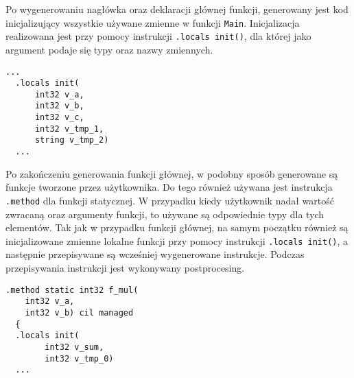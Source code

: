 \par Po wygenerowaniu nagłówka oraz deklaracji głównej funkcji, generowany jest kod inicjalizujący wszystkie używane zmienne w funkcji \texttt{Main}. Inicjalizacja realizowana jest przy pomocy instrukcji \texttt{.locals init()}, dla której jako argument podaje się typy oraz nazwy zmiennych.

\begin{lstlisting}[language=IL, caption={Kod deklaracji zmiennych lokalnych funkcji głównej}, label=alg:asm]
  ...
  .locals init(
      int32 v_a,
      int32 v_b,
      int32 v_c,
      int32 v_tmp_1,
      string v_tmp_2)
  ...
\end{lstlisting}

\par Po zakończeniu generowania funkcji głównej, w podobny sposób generowane są funkcje tworzone przez użytkownika. Do tego również używana jest instrukcja \texttt{.method} dla funkcji statycznej. W przypadku kiedy użytkownik nadał wartość zwracaną oraz argumenty funkcji, to używane są odpowiednie typy dla tych elementów. Tak jak w przypadku funkcji głównej, na samym początku również są inicjalizowane zmienne lokalne funkcji przy pomocy instrukcji \texttt{.locals init()}, a następnie przepisywane są wcześniej wygenerowane instrukcje. Podczas przepisywania instrukcji jest wykonywany postprocesing.

\begin{lstlisting}[language=IL, caption={Kod deklaracji przykładowej funkcji}, label=alg:asm]
  .method static int32 f_mul(
    int32 v_a, 
    int32 v_b) cil managed
  {
  .locals init(
        int32 v_sum,
        int32 v_tmp_0)
  ...
\end{lstlisting}

